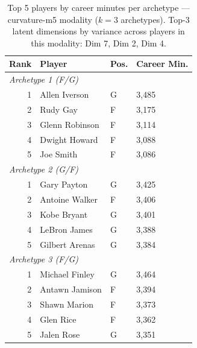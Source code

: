 \begin{table}[htbp]
  \centering\small
  \begin{tabular}{rlll}
    \toprule
    Rank & Player & Pos. & Career Min. \\
    \midrule
    \multicolumn{4}{l}{\textit{Archetype 1 (F/G)}} \\
    \midrule
    1 & Allen Iverson & G & 3,485 \\
    2 & Rudy Gay & F & 3,175 \\
    3 & Glenn Robinson & F & 3,114 \\
    4 & Dwight Howard & F & 3,088 \\
    5 & Joe Smith & F & 3,086 \\
    \midrule[0.4pt]
    \multicolumn{4}{l}{\textit{Archetype 2 (G/F)}} \\
    \midrule
    1 & Gary Payton & G & 3,425 \\
    2 & Antoine Walker & F & 3,406 \\
    3 & Kobe Bryant & G & 3,401 \\
    4 & LeBron James & G & 3,388 \\
    5 & Gilbert Arenas & G & 3,384 \\
    \midrule[0.4pt]
    \multicolumn{4}{l}{\textit{Archetype 3 (F/G)}} \\
    \midrule
    1 & Michael Finley & G & 3,464 \\
    2 & Antawn Jamison & F & 3,394 \\
    3 & Shawn Marion & F & 3,373 \\
    4 & Glen Rice & F & 3,362 \\
    5 & Jalen Rose & G & 3,351 \\
    \bottomrule
  \end{tabular}
  \caption{Top 5 players by career minutes per archetype --- curvature-m5 modality ($k=3$ archetypes). Top-3 latent dimensions by variance across players in this modality: Dim 7, Dim 2, Dim 4.}
  \label{tab:arch_reps_curvature_m5}
\end{table}

